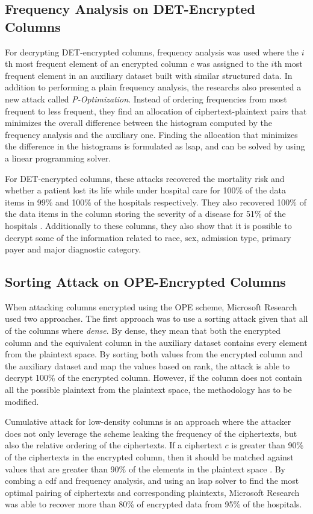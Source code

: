 \subsection{Frequency Analysis on DET-Encrypted Columns}

For decrypting DET-encrypted columns, frequency analysis was used where the $i$th most frequent element of an encrypted column $c$ was assigned to the $i$th most frequent element in an auxiliary dataset built with similar structured data. In addition to performing a plain frequency analysis, the researchs also presented a new attack called \emph{P-Optimization}. Instead of ordering frequencies from most frequent to less frequent, they find an allocation of ciphertext-plaintext pairs that minimizes the overall difference between the histogram computed by the frequency analysis and the auxiliary one. Finding the allocation that minimizes the difference in the histograms is formulated as \gls{lsap}, and can be solved by using a linear programming solver.

For DET-encrypted columns, these attacks recovered the mortality risk and whether a patient lost its life while under hospital care for 100\% of the data items in 99\% and 100\% of the hospitals respectively. They also recovered 100\% of the data items in the column storing the severity of a disease for 51\% of the hospitals \cite{microsoft_cryptdb}. Additionally to these columns, they also show that it is possible to decrypt some of the information related to race, sex, admission type, primary payer and major diagnostic category.

\subsection{Sorting Attack on OPE-Encrypted Columns}

When attacking columns encrypted using the OPE scheme, Microsoft Research used two approaches. The first approach was to use a sorting attack given that all of the columns where \emph{dense}. By dense, they mean that both the encrypted column and the equivalent column in the auxiliary dataset contains every element from the plaintext space. By sorting both values from the encrypted column and the auxiliary dataset and map the values based on rank, the attack is able to decrypt 100\% of the encrypted column. However, if the column does not contain all the possible plaintext from the plaintext space, the methodology has to be modified.

Cumulative attack for low-density columns is an approach where the attacker does not only leverage the scheme leaking the frequency of the ciphertexts, but also the relative ordering of the ciphertexts. If a ciphertext $c$ is greater than 90\% of the ciphertexts in the encrypted column, then it should be matched against values that are greater than 90\% of the elements in the plaintext space \cite{microsoft_cryptdb}. By combing a \gls{cdf} and frequency analysis, and using an \gls{lsap} solver to find the most optimal pairing of ciphertexts and corresponding plaintexts, Microsoft Research was able to recover more than 80\% of encrypted data from 95\% of the hospitals.

